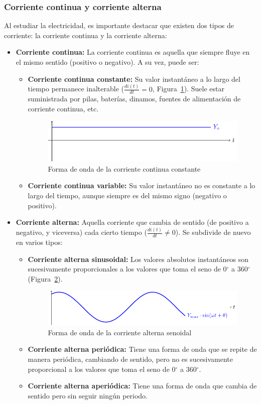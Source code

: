 	\subsubsection{Corriente continua y corriente alterna} \label{sec.cc-ca}
	Al estudiar la electricidad, es importante destacar que existen dos tipos de corriente: la corriente continua y la corriente alterna:
	\begin{itemize}
		\item \textbf{Corriente continua:} La corriente continua es aquella que siempre fluye en el mismo sentido (positivo o negativo). A su vez, puede ser:
		\begin{itemize}
			\item \textbf{Corriente continua constante:} Su valor instantáneo a lo largo del tiempo permanece inalterable ($\frac{di(t)}{dt} = 0$, Figura~\ref{fig.continua}). Suele estar suministrada por pilas, baterías, dinamos, fuentes de alimentación de corriente continua, etc. 
			\begin{figure}[H]
				\centering	\includegraphics[width=0.75\linewidth]{../figs/continua.pdf}
				\caption{Forma de onda de la corriente continua constante}
				\label{fig.continua}
			\end{figure}
			\item \textbf{Corriente continua variable:} Su valor instantáneo no es constante a lo largo del tiempo, aunque siempre es del mismo signo (negativo o positivo). 
		\end{itemize}
		\item \textbf{Corriente alterna:} Aquella corriente que cambia de sentido (de positivo a negativo, y viceversa) cada cierto tiempo ($\frac{di(t)}{dt} \neq 0$). Se subdivide de nuevo en varios tipos:
		\begin{itemize}
			\item \textbf{Corriente alterna sinusoidal:} Los valores absolutos instantáneos son sucesivamente proporcionales a los valores que toma el seno de 0$^\circ$ a 360$^\circ$ (Figura~\ref{fig.sinBT1}).
			\begin{figure}[H]
				\centering
				\includegraphics[width=0.75\linewidth]{../figs/sin.pdf}
				\caption{Forma de onda de la corriente alterna senoidal}
				\label{fig.sinBT1}
			\end{figure}
			\item \textbf{Corriente alterna periódica:} Tiene una forma de onda que se repite de manera periódica, cambiando de sentido, pero no es sucesivamente proporcional a los valores que toma el seno de 0$^\circ$ a 360$^\circ$.
			\item \textbf{Corriente alterna aperiódica:} Tiene una forma de onda que cambia de sentido pero sin seguir ningún periodo.
		\end{itemize}
	\end{itemize}
